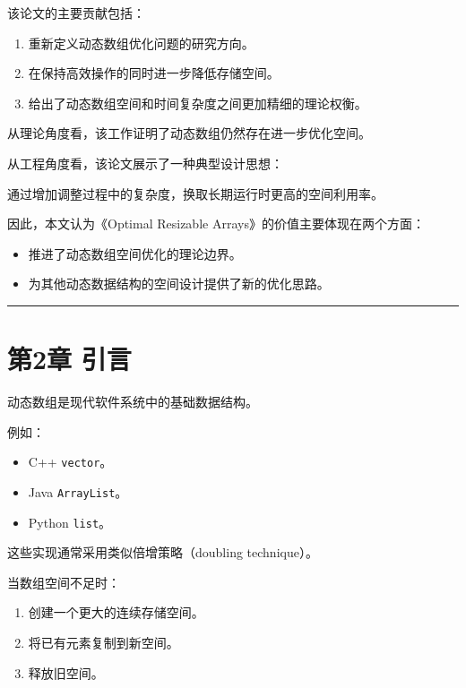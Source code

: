 \documentclass[
  UTF8,
  a4paper,
  12pt]{ctexart}
\providecommand{\tightlist}{%
  \setlength{\itemsep}{0pt}\setlength{\parskip}{0pt}}
\begin{document}
该论文的主要贡献包括：

\begin{enumerate}
\def\labelenumi{\arabic{enumi}.}
\tightlist
\item
  重新定义动态数组优化问题的研究方向。
\item
  在保持高效操作的同时进一步降低存储空间。
\item
  给出了动态数组空间和时间复杂度之间更加精细的理论权衡。
\end{enumerate}

从理论角度看，该工作证明了动态数组仍然存在进一步优化空间。

从工程角度看，该论文展示了一种典型设计思想：

通过增加调整过程中的复杂度，换取长期运行时更高的空间利用率。

因此，本文认为《Optimal Resizable Arrays》的价值主要体现在两个方面：

\begin{itemize}
\tightlist
\item
  推进了动态数组空间优化的理论边界。
\item
  为其他动态数据结构的空间设计提供了新的优化思路。
\end{itemize}

\begin{center}\rule{0.5\linewidth}{0.5pt}\end{center}

\section{第2章 引言}\label{ux7b2c2ux7ae0-ux5f15ux8a00}

动态数组是现代软件系统中的基础数据结构。

例如：

\begin{itemize}
\tightlist
\item
  C++ \texttt{vector}。
\item
  Java \texttt{ArrayList}。
\item
  Python \texttt{list}。
\end{itemize}

这些实现通常采用类似倍增策略（doubling technique）。

当数组空间不足时：

\begin{enumerate}
\def\labelenumi{\arabic{enumi}.}
\tightlist
\item
  创建一个更大的连续存储空间。
\item
  将已有元素复制到新空间。
\item
  释放旧空间。
\end{enumerate}
\end{document}
